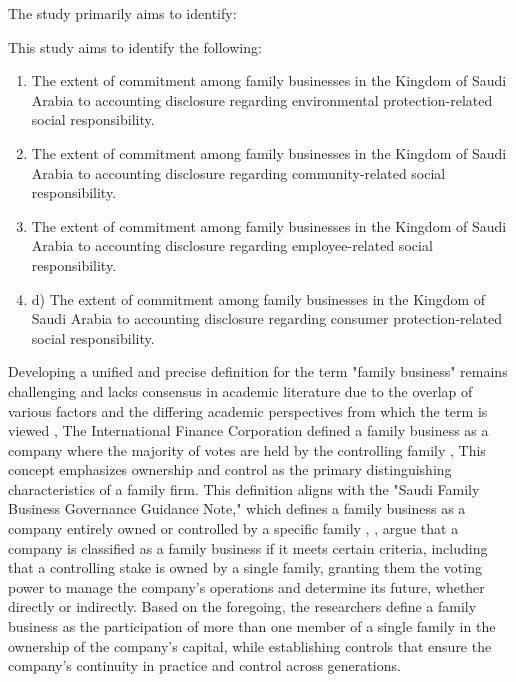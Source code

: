\documentclass[10pt]{NSP1}
\begin{document}
\par\vspace{6.0pt}\vspace{6.0pt}

The study primarily aims to identify:

This study aims to identify the following:

\begin{enumerate}
  \item The extent of commitment among family businesses in the Kingdom of Saudi Arabia to accounting disclosure regarding environmental protection-related social responsibility.
  \item The extent of commitment among family businesses in the Kingdom of Saudi Arabia to accounting disclosure regarding community-related social responsibility.
  \item The extent of commitment among family businesses in the Kingdom of Saudi Arabia to accounting disclosure regarding employee-related social responsibility.
  \item d) The extent of commitment among family businesses in the Kingdom of Saudi Arabia to accounting disclosure regarding consumer protection-related social responsibility.
\end{enumerate}

\par\vspace{6.0pt}\vspace{12.0pt}

\par\medskip{}\smallskip

Developing a unified and precise definition for the term "family business" remains challenging and lacks consensus in academic literature due to the overlap of various factors and the differing academic perspectives from which the term is viewed \cite{ref12}, The International Finance Corporation defined a family business as a company where the majority of votes are held by the controlling family \cite{ref38}, This concept emphasizes ownership and control as the primary distinguishing characteristics of a family firm. This definition aligns with the "Saudi Family Business Governance Guidance Note," which defines a family business as a company entirely owned or controlled by a specific family \cite{ref11}, \cite{ref13}, argue that a company is classified as a family business if it meets certain criteria, including that a controlling stake is owned by a single family, granting them the voting power to manage the company's operations and determine its future, whether directly or indirectly. Based on the foregoing, the researchers define a family business as the participation of more than one member of a single family in the ownership of the company's capital, while establishing controls that ensure the company's continuity in practice and control across generations.
\end{document}

